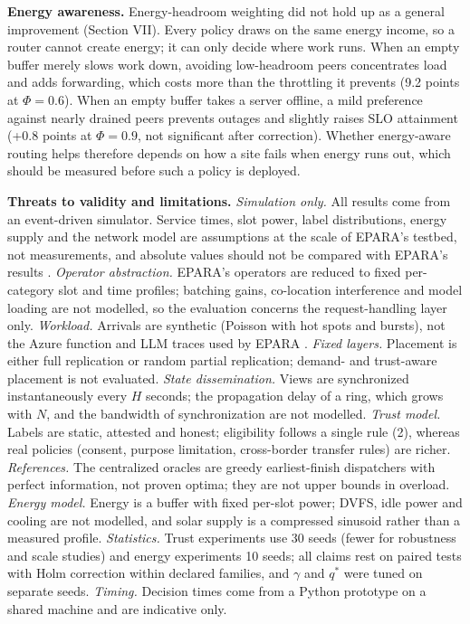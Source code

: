 \documentclass[journal]{IEEEtran}
\begin{document}
\textbf{Energy awareness.} Energy-headroom weighting did not hold up as a general improvement (Section VII). Every policy draws on the same energy income, so a router cannot create energy; it can only decide where work runs. When an empty buffer merely slows work down, avoiding low-headroom peers concentrates load and adds forwarding, which costs more than the throttling it prevents (9.2 points at \(\Phi=0.6\)). When an empty buffer takes a server offline, a mild preference against nearly drained peers prevents outages and slightly raises SLO attainment (+0.8 points at \(\Phi=0.9\), not significant after correction). Whether energy-aware routing helps therefore depends on how a site fails when energy runs out, which should be measured before such a policy is deployed.

\textbf{Threats to validity and limitations.} \emph{Simulation only.} All results come from an event-driven simulator. Service times, slot power, label distributions, energy supply and the network model are assumptions at the scale of EPARA's testbed, not measurements, and absolute values should not be compared with EPARA's results \cite{epara2025}. \emph{Operator abstraction.} EPARA's operators are reduced to fixed per-category slot and time profiles; batching gains, co-location interference and model loading are not modelled, so the evaluation concerns the request-handling layer only. \emph{Workload.} Arrivals are synthetic (Poisson with hot spots and bursts), not the Azure function and LLM traces used by EPARA \cite{epara2025,shahrad2020serverless}. \emph{Fixed layers.} Placement is either full replication or random partial replication; demand- and trust-aware placement is not evaluated. \emph{State dissemination.} Views are synchronized instantaneously every \(H\) seconds; the propagation delay of a ring, which grows with \(N\), and the bandwidth of synchronization are not modelled. \emph{Trust model.} Labels are static, attested and honest; eligibility follows a single rule (2), whereas real policies (consent, purpose limitation, cross-border transfer rules) are richer. \emph{References.} The centralized oracles are greedy earliest-finish dispatchers with perfect information, not proven optima; they are not upper bounds in overload. \emph{Energy model.} Energy is a buffer with fixed per-slot power; DVFS, idle power and cooling are not modelled, and solar supply is a compressed sinusoid rather than a measured profile. \emph{Statistics.} Trust experiments use 30 seeds (fewer for robustness and scale studies) and energy experiments 10 seeds; all claims rest on paired tests with Holm correction within declared families, and \(\gamma\) and \(q^\ast\) were tuned on separate seeds. \emph{Timing.} Decision times come from a Python prototype on a shared machine and are indicative only.
\end{document}
